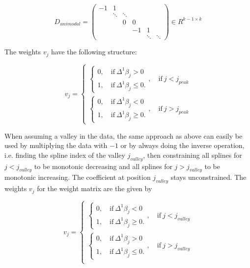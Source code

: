 $$D_{unimodal} = \begin{pmatrix} -1 & 1 \\ 
					    & \ddots & \ddots  \\
					    & & 0 & 0 \\ 
					    & & & -1 & 1 \\
					    & & & &  \ddots & \ddots 
			 \end{pmatrix} \in R^{k-1 \times k}$$

The weights $v_j$ have the following structure:

$$v_j = \begin{cases} \begin{cases} 0, \quad \text{if} \ \Delta^1\beta_j > 0 \\ 
1, \quad \text{if} \ \Delta^1\beta_j \le 0.\end{cases}, \quad \text{if} \ j < j_{peak} \\ \begin{cases} 0, \quad \text{if} \ \Delta^1\beta_j < 0 \\ 
1, \quad \text{if} \ \Delta^1\beta_j \ge 0.\end{cases}  , \quad \text{if} \ j > j_{peak}  \end{cases}$$

When assuming a valley in the data, the same approach as above can easily be used by multiplying the data with $-1$ or by always doing the inverse operation, i.e. finding the spline index of the valley $j_{valley}$, then constraining all splines for $j < j_{valley}$ to be monotonic decreasing and all splines for $j > j_{valley}$ to be monotonic increasing. The coefficient at position $j_{valley}$ stays unconstrained. The weights $v_j$ for the weight matrix are the given by

$$v_j = \begin{cases}\begin{cases} 0, \quad \text{if} \ \Delta^1\beta_j < 0 \\ 
1, \quad \text{if} \ \Delta^1\beta_j \ge 0.\end{cases}  , \quad \text{if} \ j < j_{valley}  \\ \begin{cases} 0, \quad \text{if} \ \Delta^1\beta_j > 0 \\ 
1, \quad \text{if} \ \Delta^1\beta_j \le 0.\end{cases}, \quad \text{if} \ j > j_{valley} \\ \end{cases}$$

